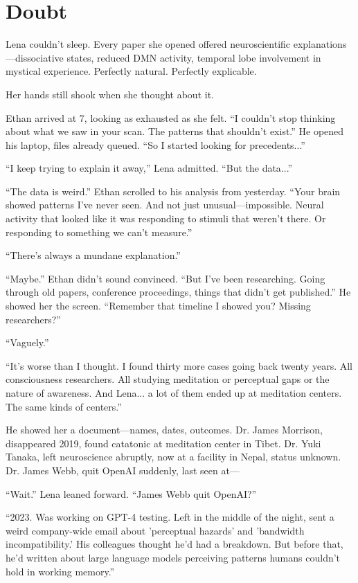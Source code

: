 \chapter{Doubt}

Lena couldn't sleep. Every paper she opened offered neuroscientific explanations—dissociative states, reduced DMN activity, temporal lobe involvement in mystical experience. Perfectly natural. Perfectly explicable.

Her hands still shook when she thought about it.

Ethan arrived at 7, looking as exhausted as she felt. ``I couldn't stop thinking about what we saw in your scan. The patterns that shouldn't exist.'' He opened his laptop, files already queued. ``So I started looking for precedents...''

``I keep trying to explain it away,'' Lena admitted. ``But the data...''

``The data is weird.'' Ethan scrolled to his analysis from yesterday. ``Your brain showed patterns I've never seen. And not just unusual—impossible. Neural activity that looked like it was responding to stimuli that weren't there. Or responding to something we can't measure.''

``There's always a mundane explanation.''

``Maybe.'' Ethan didn't sound convinced. ``But I've been researching. Going through old papers, conference proceedings, things that didn't get published.'' He showed her the screen. ``Remember that timeline I showed you? Missing researchers?''

``Vaguely.''

``It's worse than I thought. I found thirty more cases going back twenty years. All consciousness researchers. All studying meditation or perceptual gaps or the nature of awareness. And Lena... a lot of them ended up at meditation centers. The same kinds of centers.''

He showed her a document—names, dates, outcomes. Dr. James Morrison, disappeared 2019, found catatonic at meditation center in Tibet. Dr. Yuki Tanaka, left neuroscience abruptly, now at a facility in Nepal, status unknown. Dr. James Webb, quit OpenAI suddenly, last seen at—

``Wait.'' Lena leaned forward. ``James Webb quit OpenAI?''

``2023. Was working on GPT-4 testing. Left in the middle of the night, sent a weird company-wide email about 'perceptual hazards' and 'bandwidth incompatibility.' His colleagues thought he'd had a breakdown. But before that, he'd written about large language models perceiving patterns humans couldn't hold in working memory.''

